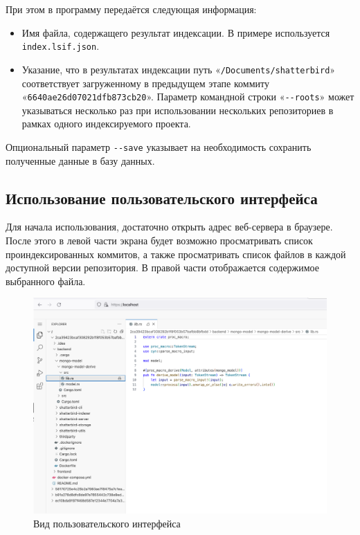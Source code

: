 При этом в программу передаётся следующая информация:
\begin{itemize}
    \item Имя файла, содержащего результат индексации. В примере используется \texttt{index.lsif.json}.
    \item Указание, что в результатах индексации путь «\texttt{/Documents/shatterbird}» соответствует загруженному в предыдущем этапе коммиту «\texttt{6640ae26d07021dfb873cb20}». Параметр командной строки «\texttt{-\/-roots}» может указываться несколько раз при использовании нескольких репозиториев в рамках одного индексируемого проекта.
\end{itemize}

Опциональный параметр \texttt{-\/-save} указывает на необходимость сохранить полученные данные в базу данных.

\subsection{Использование пользовательского интерфейса}

Для начала использования, достаточно открыть адрес веб-сервера в браузере. После этого в левой части экрана будет возможно просматривать список проиндексированных коммитов, а также просматривать список файлов в каждой доступной версии репозитория. В правой части отображается содержимое выбранного файла.

\begin{figure}[H]
    \centering
    \includegraphics[width=\textwidth]{figures/intro.png}
    \caption{Вид пользовательского интерфейса}
\end{figure}

